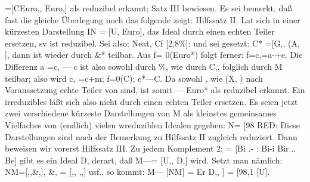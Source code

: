 \documentclass[11pt,a4paper]{article}
\theoremstyle{plain}
\theoremstyle{definition}
\begin{document}
=[CEuro,, Euro,] als reduzibel 
erkannt; Satz III bewiesen. 
Es sei bemerkt, daß fast die gleiche Überlegung noch das folgende zeigt: 
Hilfssatz II. Lat sich in einer kürzesten Darstellung IN = [U, Euro], 
das Ideal  durch einen echten Teiler ersetzen, sv ist  reduzibel. 
Sei also: 
Neat, Cf [2,8\%]: 
und sei gesetzt: 
C* =[G,, (A, ], 
dann ist wieder  durch \&* teilbar. 
Aus f= 0(Euro*) folgt ferner: 
f=c,=a-+e. 
Die Differenz a =c, --- c ist also sowohl durch \%, wie durch C,, folglich 
durch M teilbar; also wird c, =c+m; f=0(C); c*---C. 
Da sowohl , wie (X, ) nach Voraussetzung 
echte Teiler von  
sind, ist somit  --- Euro* als reduzibel erkannt. 
Ein irreduzibles  läßt 
sich also 
nicht durch einen echten Teiler 
ersetzen. 
Es seien jetzt zwei verschiedene kürzeste Darstellungen von M als 
kleinstes gemeinsames Vielfaches von (endlich) vielen wreduziblen Idealen 
gegeben: 
N= [98 
RED: 
Diese Darstellungen 
sind nach der Bemerkung zu Hilfssatz II zugleich 
reduziert. 
Dann beweisen wir vorerst 
Hilfssatz III. 
Zu jedem Komplement 2; = [Bi .- 
: Bi-i Bir... Be] 
gibt es ein Ideal D, derart, daß 
M---= [U,, D,] wird. 
Setzt man nämlich: NM=[,,\&,], \&, = [,, ,,] usf., so kommt: 
M--- [NM] = Er \guillemotright{}D,, 
] = [98,1 [U].
\end{document}
